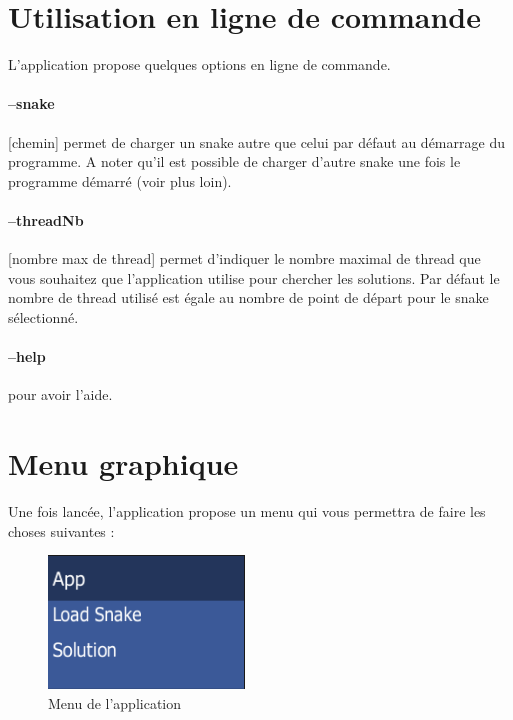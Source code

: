 \section*{Utilisation en ligne de commande}
L'application propose quelques options en ligne de commande.

\paragraph{--snake} [chemin] permet de charger un snake autre que celui par défaut au démarrage du programme. A noter qu'il est possible de charger d'autre snake une fois le programme démarré (voir plus loin).

\paragraph{--threadNb} [nombre max de thread] permet d'indiquer le nombre maximal de thread que vous souhaitez que l'application utilise pour chercher les solutions. Par défaut le nombre de thread utilisé est égale au nombre de point de départ pour le snake sélectionné.

\paragraph{--help} pour avoir l'aide.

\section*{Menu graphique}
Une fois lancée, l'application propose un menu qui vous permettra de faire les choses suivantes :

\begin{figure}[h]
 \centering
 \includegraphics[scale=0.7,keepaspectratio=true]{img/menu1.png}
 \caption{Menu de l'application}
\end{figure}